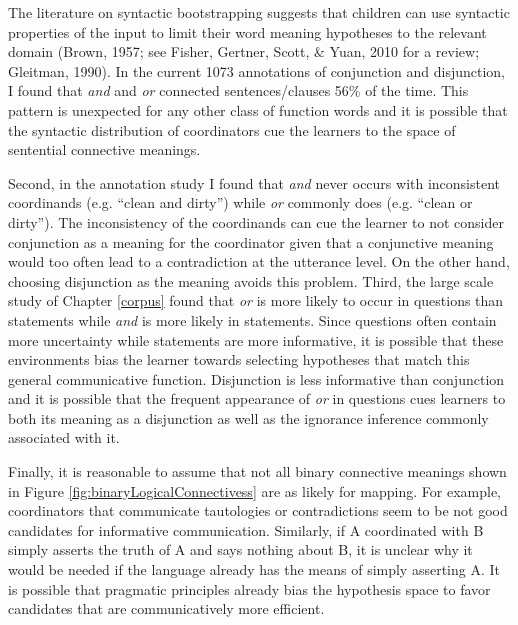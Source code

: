 \documentclass[floatsintext,man]{apa6}
\theoremstyle{definition}
\theoremstyle{definition}
\theoremstyle{definition}
\theoremstyle{remark}
\begin{document}
The literature on syntactic bootstrapping suggests that children can use
syntactic properties of the input to limit their word meaning hypotheses
to the relevant domain (Brown, 1957; see Fisher, Gertner, Scott, \&
Yuan, 2010 for a review; Gleitman, 1990). In the current 1073
annotations of conjunction and disjunction, I found that \emph{and} and
\emph{or} connected sentences/clauses 56\% of the time. This pattern is
unexpected for any other class of function words and it is possible that
the syntactic distribution of coordinators cue the learners to the space
of sentential connective meanings.

Second, in the annotation study I found that \emph{and} never occurs
with inconsistent coordinands (e.g. \enquote{clean and dirty}) while
\emph{or} commonly does (e.g. \enquote{clean or dirty}). The
inconsistency of the coordinands can cue the learner to not consider
conjunction as a meaning for the coordinator given that a conjunctive
meaning would too often lead to a contradiction at the utterance level.
On the other hand, choosing disjunction as the meaning avoids this
problem. Third, the large scale study of Chapter \ref{corpus} found that
\emph{or} is more likely to occur in questions than statements while
\emph{and} is more likely in statements. Since questions often contain
more uncertainty while statements are more informative, it is possible
that these environments bias the learner towards selecting hypotheses
that match this general communicative function. Disjunction is less
informative than conjunction and it is possible that the frequent
appearance of \emph{or} in questions cues learners to both its meaning
as a disjunction as well as the ignorance inference commonly associated
with it.

Finally, it is reasonable to assume that not all binary connective
meanings shown in Figure \ref{fig:binaryLogicalConnectivess} are as
likely for mapping. For example, coordinators that communicate
tautologies or contradictions seem to be not good candidates for
informative communication. Similarly, if A coordinated with B simply
asserts the truth of A and says nothing about B, it is unclear why it
would be needed if the language already has the means of simply
asserting A. It is possible that pragmatic principles already bias the
hypothesis space to favor candidates that are communicatively more
efficient.
\end{document}
